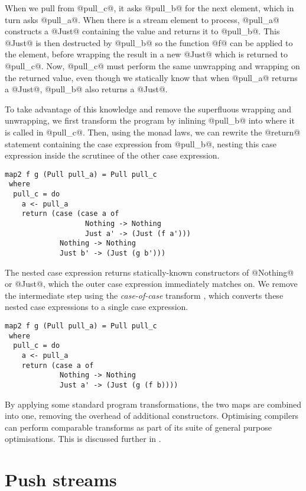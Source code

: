 When we pull from @pull_c@, it asks @pull_b@ for the next element, which in turn asks @pull_a@.
When there is a stream element to process, @pull_a@ constructs a @Just@ containing the value and returns it to @pull_b@.
This @Just@ is then destructed by @pull_b@ so the function @f@ can be applied to the element, before wrapping the result in a new @Just@ which is returned to @pull_c@.
Now, @pull_c@ must perform the same unwrapping and wrapping on the returned value, even though we statically know that when @pull_a@ returns a @Just@, @pull_b@ also returns a @Just@.

To take advantage of this knowledge and remove the superfluous wrapping and unwrapping, we first transform the program by inlining @pull_b@ into where it is called in @pull_c@.
Then, using the monad laws, we can rewrite the @return@ statement containing the case expression from @pull_b@, nesting this case expression inside the scrutinee of the other case expression.

\begin{lstlisting}
map2 f g (Pull pull_a) = Pull pull_c
 where
  pull_c = do
    a <- pull_a
    return (case (case a of
                   Nothing -> Nothing
                   Just a' -> (Just (f a')))
             Nothing -> Nothing
             Just b' -> (Just (g b')))
\end{lstlisting}

The nested case expression returns statically-known constructors of @Nothing@ or @Just@, which the outer case expression immediately matches on.
We remove the intermediate step using the \emph{case-of-case} transform \cite{jones1998transformation}, which converts these nested case expressions to a single case expression.


\begin{lstlisting}
map2 f g (Pull pull_a) = Pull pull_c
 where
  pull_c = do
    a <- pull_a
    return (case a of
             Nothing -> Nothing
             Just a' -> (Just (g (f b))))
\end{lstlisting}

By applying some standard program transformations, the two maps are combined into one, removing the overhead of additional constructors.
Optimising compilers can perform comparable transforms as part of its suite of general purpose optimisations.
This is discussed further in .

\section{Push streams}
\label{taxonomy/push}

